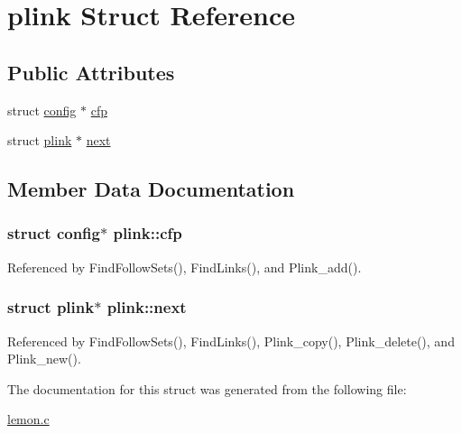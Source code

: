 \hypertarget{structplink}{\section{plink Struct Reference}
\label{structplink}
}
\subsection*{Public Attributes}
\begin{DoxyCompactItemize}
\item 
struct \hyperlink{structconfig}{config} $\ast$ \hyperlink{structplink_a64bd64aa55919600850dc66ce93e7025}{cfp}
\item 
struct \hyperlink{structplink}{plink} $\ast$ \hyperlink{structplink_a79e97576ac75a0c9402c593aa63afb99}{next}
\end{DoxyCompactItemize}


\subsection{Member Data Documentation}
\hypertarget{structplink_a64bd64aa55919600850dc66ce93e7025}{
\subsubsection[{cfp}]{\setlength{\rightskip}{0pt plus 5cm}struct {\bf config}$\ast$ plink\-::cfp}}\label{structplink_a64bd64aa55919600850dc66ce93e7025}


Referenced by Find\-Follow\-Sets(), Find\-Links(), and Plink\-\_\-add().

\hypertarget{structplink_a79e97576ac75a0c9402c593aa63afb99}{
\subsubsection[{next}]{\setlength{\rightskip}{0pt plus 5cm}struct {\bf plink}$\ast$ plink\-::next}}\label{structplink_a79e97576ac75a0c9402c593aa63afb99}


Referenced by Find\-Follow\-Sets(), Find\-Links(), Plink\-\_\-copy(), Plink\-\_\-delete(), and Plink\-\_\-new().



The documentation for this struct was generated from the following file\-:\begin{DoxyCompactItemize}
\item 
\hyperlink{lemon_8c}{lemon.\-c}\end{DoxyCompactItemize}
